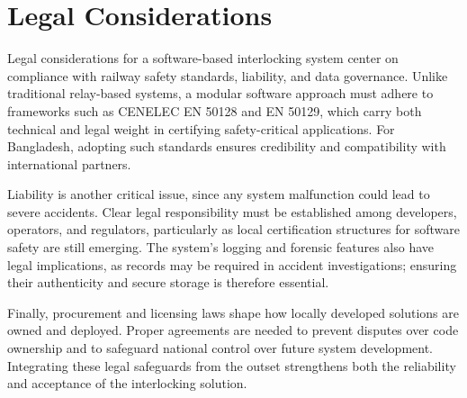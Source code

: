 \section{Legal Considerations}
\label{sec:outro:legal}

Legal considerations for a software-based interlocking system center on compliance with railway safety standards, liability, and data governance. Unlike traditional relay-based systems, a modular software approach must adhere to frameworks such as CENELEC EN 50128 and EN 50129, which carry both technical and legal weight in certifying safety-critical applications. For Bangladesh, adopting such standards ensures credibility and compatibility with international partners.

Liability is another critical issue, since any system malfunction could lead to severe accidents. Clear legal responsibility must be established among developers, operators, and regulators, particularly as local certification structures for software safety are still emerging. The system’s logging and forensic features also have legal implications, as records may be required in accident investigations; ensuring their authenticity and secure storage is therefore essential.

Finally, procurement and licensing laws shape how locally developed solutions are owned and deployed. Proper agreements are needed to prevent disputes over code ownership and to safeguard national control over future system development. Integrating these legal safeguards from the outset strengthens both the reliability and acceptance of the interlocking solution.